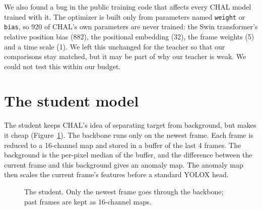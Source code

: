 \documentclass[11pt,a4paper]{article}
\begin{document}
We also found a bug in the public training code that affects every CHAL model trained with it. The optimizer is
built only from parameters named \texttt{weight} or \texttt{bias}, so 920 of CHAL's own parameters are never
trained: the Swin transformer's relative position bias (882), the positional embedding (32), the frame weights (5)
and a time scale (1). We left this unchanged for the teacher so that our comparisons stay matched, but it may be
part of why our teacher is weak. We could not test this within our budget.

\section{The student model}

The student keeps CHAL's idea of separating target from background, but makes it cheap
(Figure~\ref{fig:student}). The backbone runs only on the newest frame. Each frame is reduced to a 16-channel map
and stored in a buffer of the last 4 frames. The background is the per-pixel median of the buffer, and the
difference between the current frame and this background gives an anomaly map. The anomaly map then scales the
current frame's features before a standard YOLOX head.

\begin{figure}[htbp]
\centering
{}
\caption{The student. Only the newest frame goes through the backbone; past frames are kept as 16-channel maps.}
\label{fig:student}
\end{figure}
\end{document}
